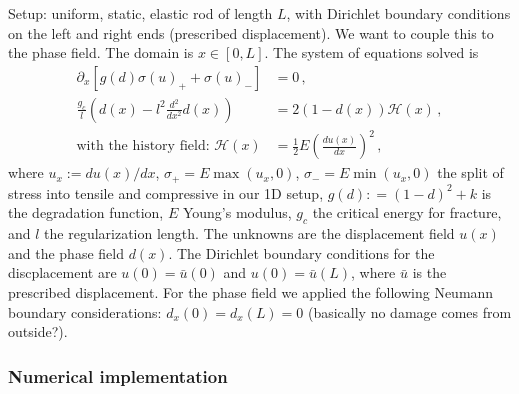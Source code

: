 \documentclass[11pt,a4paper]{article}
\newcommand{\p}{\partial}
\begin{document}
Setup: uniform, static, elastic rod of length $L$, with Dirichlet boundary conditions on the left and right ends (prescribed displacement). We want to couple this to the phase field. The domain is $x \in [0,L]$. The system of equations solved is
\begin{align}
    \p_x \left[ g(d) \sigma(u)_+ + \sigma(u)_- \right]
    &= 0
    \,,
    \label{eq:static_elastic_rod_1d}
    \\
    \frac{g_c}{l} \left(d(x) - l^2 \frac{d^2}{dx^2} d(x) \right)
    & = 2 \left( 1 - d(x) \right) \mathcal{H}(x)
    \,,
    \label{eq:1d_phase_field}
    \\
    \text{with the history field: }
    \mathcal{H}(x)
    & = \frac{1}{2} E \left( \frac{d u(x)}{dx} \right)^2
    \,, \nonumber
\end{align}
where $u_x := du(x)/dx$, $\sigma_+ = E \max(u_x, 0)$, $\sigma_- = E \min(u_x, 0)$ the split of stress into tensile and compressive in our 1D setup, $g(d) : = (1-d)^2 + k$ is the degradation function, $E$ Young's modulus, $g_c$ the critical energy for fracture, and $l$ the regularization length. The unknowns are the displacement field $u(x)$ and the phase field $d(x)$. The Dirichlet boundary conditions for the discplacement are $u(0)=\bar{u}(0)$ and $u(0)=\bar{u}(L)$, where $\bar{u}$ is the prescribed displacement. For the phase field we applied the following Neumann boundary considerations: $d_x(0) = d_x(L) = 0$ (basically no damage comes from outside?).


\subsubsection{Numerical implementation}
\end{document}
